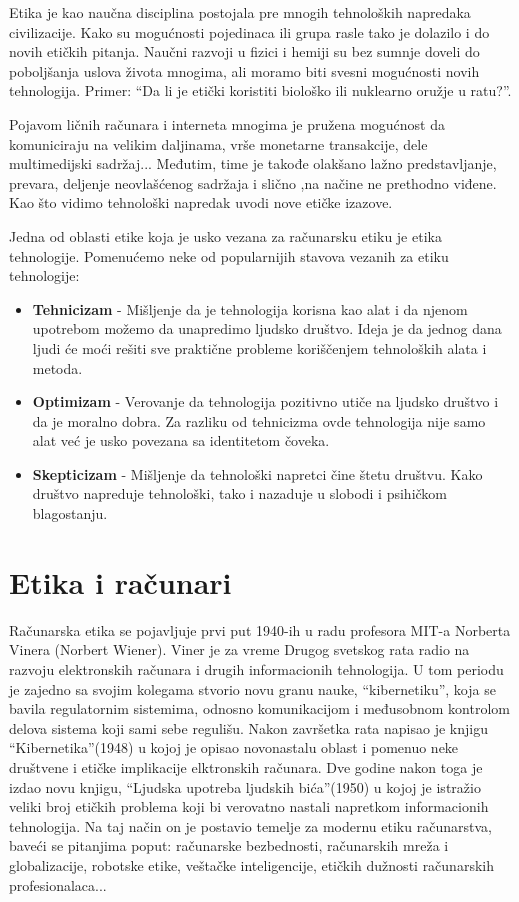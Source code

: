 \documentclass[a4paper]{article}
\begin{document}
Etika je kao naučna disciplina postojala pre mnogih tehnoloških napredaka civilizacije. Kako su mogućnosti pojedinaca ili grupa rasle tako je dolazilo i do novih etičkih pitanja. Naučni razvoji u fizici i hemiji su bez sumnje doveli do poboljšanja uslova života mnogima, ali moramo biti svesni mogućnosti novih tehnologija. Primer: ``Da li je etički koristiti biološko ili nuklearno oružje u ratu?''.

Pojavom ličnih računara i interneta mnogima je pružena mogućnost da komuniciraju na velikim daljinama, vrše monetarne transakcije, dele multimedijski sadržaj... Međutim, time je takođe olakšano lažno predstavljanje, prevara, deljenje neovlašćenog sadržaja i slično ,na načine ne prethodno viđene.
Kao što vidimo tehnološki napredak uvodi nove etičke izazove.

Jedna od oblasti etike koja je usko vezana za računarsku etiku je etika tehnologije. Pomenućemo neke od popularnijih stavova vezanih za etiku tehnologije:
\begin{itemize}
	\item \textbf{Tehnicizam} -
	Mišljenje da je tehnologija korisna kao alat i da njenom upotrebom možemo da unapredimo ljudsko društvo. Ideja je da jednog dana ljudi će moći rešiti sve praktične probleme koriščenjem tehnoloških alata i metoda.
	\item \textbf{Optimizam} - Verovanje da tehnologija pozitivno utiče na ljudsko društvo i da je moralno dobra. Za razliku od tehnicizma ovde tehnologija nije samo alat već je usko povezana sa identitetom čoveka.
	\item \textbf{Skepticizam} - Mišljenje da tehnološki napretci čine štetu društvu.
	Kako društvo napreduje tehnološki, tako i nazaduje u slobodi i psihičkom blagostanju.
\end{itemize}


\section{Etika i računari}

Računarska etika se pojavljuje prvi put 1940-ih u radu profesora MIT-a
Norberta Vinera (Norbert Wiener)\cite{bynum}. Viner je za vreme Drugog svetskog rata radio na razvoju elektronskih računara i drugih informacionih tehnologija. U tom periodu je zajedno sa svojim kolegama stvorio novu granu nauke, ``kibernetiku'', koja se bavila regulatornim sistemima, odnosno komunikacijom i međusobnom kontrolom delova sistema koji sami sebe regulišu.
Nakon završetka rata napisao je knjigu ``Kibernetika''(1948) u kojoj je opisao novonastalu oblast i pomenuo neke društvene i etičke implikacije elktronskih računara. Dve godine nakon toga je izdao novu knjigu, ``Ljudska upotreba ljudskih bića''(1950) u kojoj je istražio veliki broj etičkih problema koji bi verovatno nastali napretkom informacionih tehnologija. Na taj način on je postavio temelje za modernu etiku računarstva, baveći se pitanjima poput: računarske bezbednosti, računarskih mreža i globalizacije, robotske etike, veštačke inteligencije, etičkih dužnosti računarskih profesionalaca...
\end{document}
